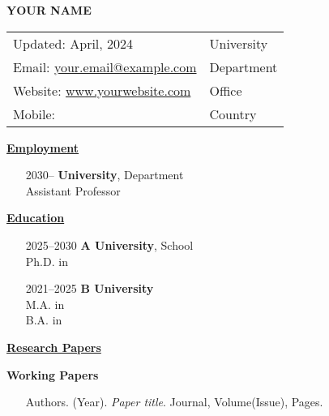 \documentclass[11pt]{article}
\newcommand{\cvsection}[1]{%
    \vspace{1em}%
    \noindent\textbf{\uline{#1}}%
    \vspace{1em}%
}
\begin{document}
\begin{center}
    {\huge\textbf{YOUR NAME}}
    \vspace{1em}
\end{center}

\noindent
\begin{tabular}{@{}p{} p{}}
    Updated: April, 2024 & \raggedleft University  \tabularnewline
    Email: \href{mailto:your.email@example.com}{your.email@example.com} & \raggedleft Department \tabularnewline
    Website: \href{http://www.yourwebsite.com}{www.yourwebsite.com} & \raggedleft Office \tabularnewline
    Mobile: & \raggedleft Country \tabularnewline
\end{tabular}

\cvsection{Employment}
\begin{itemize}[leftmargin=7em, labelwidth=5em, labelsep=1em, itemindent=0em, align=left]
    \item[2030–] \textbf{University}, Department\\
                      Assistant Professor
\end{itemize}

\cvsection{Education}
\begin{itemize}[leftmargin=7em, labelwidth=5em, labelsep=1em, itemindent=0em, align=left]
    \item[2025–2030] \textbf{A University}, School\\
                      Ph.D. in 
    \item[2021–2025] \textbf{B University}\\
                      M.A. in  \\
                      B.A. in 
\end{itemize}

\cvsection{Research Papers}


\noindent\textbf{Working Papers}
\begin{itemize}[leftmargin=1em, labelwidth=0em, labelsep=0em, itemindent=0em, align=left]
    \item[] Authors. (Year). \textit{Paper title}. Journal, Volume(Issue), Pages.
\end{itemize}
\end{document}
